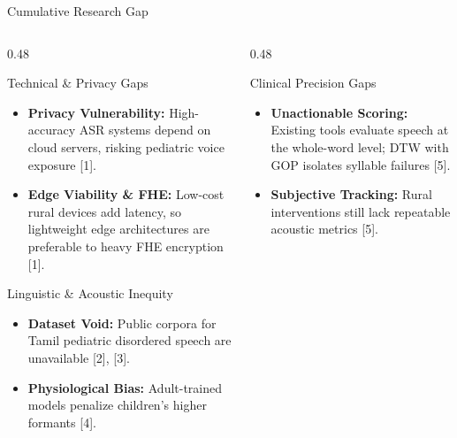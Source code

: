 \documentclass[aspectratio=169, 11pt, xcolor=table]{beamer}
\begin{document}
\begin{frame}{Cumulative Research Gap}
    \vspace{-5mm}
    \begin{columns}[T, totalwidth=\textwidth]

        \begin{column}{0.48\textwidth}
            \begin{block}{Technical \& Privacy Gaps}
                \tiny
                \begin{itemize}
                    \setlength{\itemsep}{2pt}
                    \item \textbf{Privacy Vulnerability:} High-accuracy ASR systems depend on cloud servers, risking pediatric voice exposure [1].
                    \item \textbf{Edge Viability \& FHE:} Low-cost rural devices add latency, so lightweight edge architectures are preferable to heavy FHE encryption [1].
                \end{itemize}
            \end{block}

            \vspace{1mm}

            \begin{block}{Linguistic \& Acoustic Inequity}
                \tiny
                \begin{itemize}
                    \setlength{\itemsep}{2pt}
                    \item \textbf{Dataset Void:} Public corpora for Tamil pediatric disordered speech are unavailable [2], [3].
                    \item \textbf{Physiological Bias:} Adult-trained models penalize children's higher formants [4].
                \end{itemize}
            \end{block}
        \end{column}

        \begin{column}{0.48\textwidth}
            \begin{block}{Clinical Precision Gaps}
                \tiny
                \begin{itemize}
                    \setlength{\itemsep}{2pt}
                    \item \textbf{Unactionable Scoring:} Existing tools evaluate speech at the whole-word level; DTW with GOP isolates syllable failures [5].
                    \item \textbf{Subjective Tracking:} Rural interventions still lack repeatable acoustic metrics [5].
                \end{itemize}
            \end{block}


\end{column}
\end{columns}
\end{frame}
\end{document}
